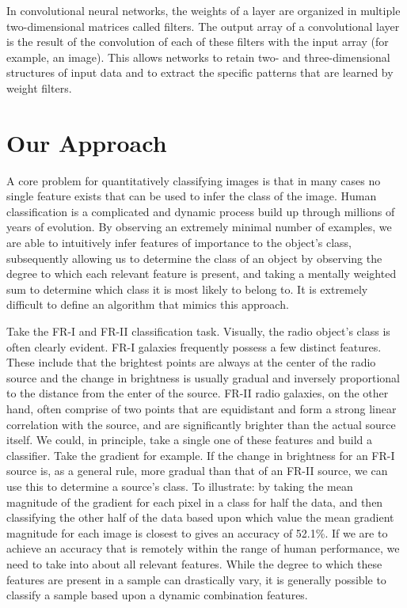 \documentclass{article}
\begin{document}
In convolutional neural networks, the weights of a layer are organized in multiple two-dimensional matrices called filters. The output array of a convolutional layer is the result of the convolution of each of these filters with the input array (for example, an image). This allows networks to retain two- and three-dimensional structures of input data and to extract the specific patterns that are learned by weight filters. 

\section{\label{sec:level1}Our Approach}
A core problem for quantitatively classifying images is that in many cases no single feature exists that can be used to infer the class of the image. Human classification is a complicated and dynamic process build up through millions of years of evolution. By observing an extremely minimal number of examples, we are able to intuitively infer features of importance to the object's class, subsequently allowing us to determine the class of an object by observing the degree to which each relevant feature is present, and taking a mentally weighted sum to determine which class it is most likely to belong to. It is extremely difficult to define an algorithm that mimics this approach.

Take the FR-I and FR-II classification task. Visually, the radio object's class is often clearly evident. FR-I galaxies frequently possess a few distinct features. These include that the brightest points are always at the center of the radio source and the change in brightness is usually gradual and inversely proportional to the distance from the enter of the source.  FR-II radio galaxies, on the other hand, often comprise of two points that are equidistant and form a strong linear correlation with the source, and are significantly brighter than the actual source itself. We could, in principle, take a single one of these features and build a classifier. Take the gradient for example. If the change in brightness for an FR-I source is, as a general rule, more gradual than that of an FR-II source, we can use this to determine a source's class. To illustrate: by taking the mean magnitude of the gradient for each pixel in a class for half the data, and then classifying the other half of the data based upon which value the mean gradient magnitude for each image is closest to gives an accuracy of 52.1\%. If we are to achieve an accuracy that is remotely within the range of human performance, we need to take into about all relevant features. While the degree to which these features are present in a sample can drastically vary, it is generally possible to classify a sample based upon a dynamic combination features. 
\end{document}
